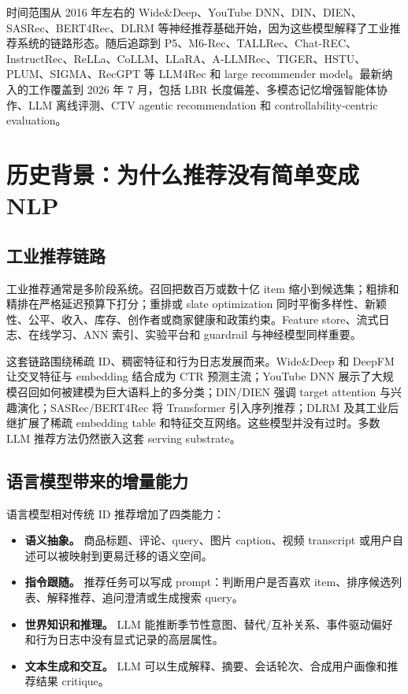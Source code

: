 \documentclass[UTF8,fontset=fandol,11pt]{ctexart}
\begin{document}
时间范围从 2016 年左右的 Wide\&Deep、YouTube DNN、DIN、DIEN、SASRec、BERT4Rec、DLRM 等神经推荐基础开始，因为这些模型解释了工业推荐系统的链路形态。随后追踪到 P5、M6-Rec、TALLRec、Chat-REC、InstructRec、ReLLa、CoLLM、LLaRA、A-LLMRec、TIGER、HSTU、PLUM、SIGMA、RecGPT 等 LLM4Rec 和 large recommender model。最新纳入的工作覆盖到 2026 年 7 月，包括 LBR 长度偏差、多模态记忆增强智能体协作、LLM 离线评测、CTV agentic recommendation 和 controllability-centric evaluation。

\section{历史背景：为什么推荐没有简单变成 NLP}

\subsection{工业推荐链路}

工业推荐通常是多阶段系统。召回把数百万或数十亿 item 缩小到候选集；粗排和精排在严格延迟预算下打分；重排或 slate optimization 同时平衡多样性、新颖性、公平、收入、库存、创作者或商家健康和政策约束。Feature store、流式日志、在线学习、ANN 索引、实验平台和 guardrail 与神经模型同样重要。

这套链路围绕稀疏 ID、稠密特征和行为日志发展而来。Wide\&Deep 和 DeepFM 让交叉特征与 embedding 结合成为 CTR 预测主流；YouTube DNN 展示了大规模召回如何被建模为巨大语料上的多分类；DIN/DIEN 强调 target attention 与兴趣演化；SASRec/BERT4Rec 将 Transformer 引入序列推荐；DLRM 及其工业后继扩展了稀疏 embedding table 和特征交互网络。这些模型并没有过时。多数 LLM 推荐方法仍然嵌入这套 serving substrate。

\subsection{语言模型带来的增量能力}

语言模型相对传统 ID 推荐增加了四类能力：

\begin{itemize}
  \item \textbf{语义抽象。} 商品标题、评论、query、图片 caption、视频 transcript 或用户自述可以被映射到更易迁移的语义空间。
  \item \textbf{指令跟随。} 推荐任务可以写成 prompt：判断用户是否喜欢 item、排序候选列表、解释推荐、追问澄清或生成搜索 query。
  \item \textbf{世界知识和推理。} LLM 能推断季节性意图、替代/互补关系、事件驱动偏好和行为日志中没有显式记录的高层属性。
  \item \textbf{文本生成和交互。} LLM 可以生成解释、摘要、会话轮次、合成用户画像和推荐结果 critique。
\end{itemize}
\end{document}

